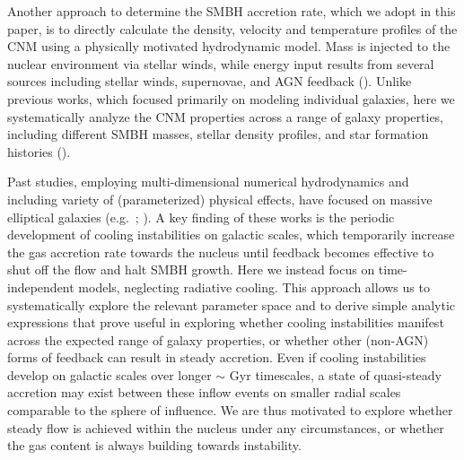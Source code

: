 \documentclass[usenatbib,fleqn]{mn2e}
\begin{document}

Another approach to determine the SMBH accretion rate, which we adopt
in this paper, is to directly calculate the density, velocity and
temperature profiles of the CNM using a physically motivated
hydrodynamic model.  Mass is injected to the nuclear environment via
stellar winds, while energy input results from several sources
including stellar winds, supernovae, and AGN feedback
(\citealt{Quataert:2004a,De-ColleGuillochon+:2012a,ShcherbakovWong+:2014a}).
Unlike previous works, which focused primarily on modeling individual galaxies, here
we systematically analyze the CNM properties across a range of galaxy properties, including different SMBH masses, stellar density profiles, and
star formation histories (\citealt{WangMerritt:2004a}).

Past studies, employing multi-dimensional numerical hydrodynamics and
including variety of (parameterized) physical effects, have focused on
massive elliptical galaxies (e.g.~\citealt{Ciotti&Ostriker07};
\citealt{Ciotti+10}).  A key finding of these works is the periodic
development of cooling instabilities on galactic scales, which
temporarily increase the gas accretion rate towards the nucleus until
feedback becomes effective to shut off the flow and halt
SMBH growth.  Here we instead focus on time-independent models,
neglecting radiative cooling.  This approach allows us to
systematically explore the relevant parameter space and to derive
simple analytic expressions that prove useful in exploring whether
cooling instabilities manifest across the expected range of galaxy
properties, or whether other (non-AGN) forms of feedback can result in
steady accretion.  Even if cooling instabilities develop on galactic
scales over longer $\sim$ Gyr timescales, a state of
quasi-steady accretion may exist between these inflow events on
smaller radial scales comparable to the sphere of influence.  We are
thus motivated to explore whether steady flow is achieved within the
nucleus under any circumstances, or whether the gas content is always
building towards instability.
\end{document}
